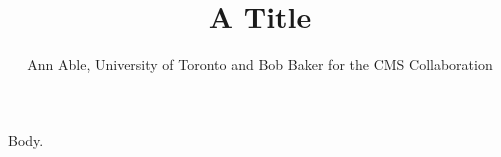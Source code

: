 \documentclass{article}
\begin{document}
\title{A Title}
\author{Ann Able, University of Toronto and Bob Baker for the CMS Collaboration}
\maketitle
Body.
\end{document}
